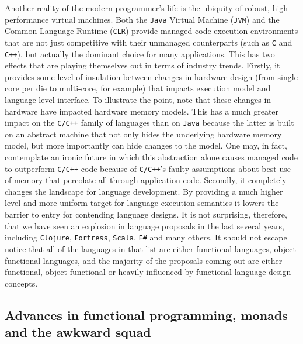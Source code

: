 Another reality of the modern programmer's life is the ubiquity of
robust, high-performance virtual machines. Both the \texttt{Java}
Virtual Machine (\texttt{JVM}) and the Common Language Runtime
(\texttt{CLR}) provide managed code execution environments that are
not just competitive with their unmanaged counterparts (such as
\texttt{C} and \texttt{C++}), but actually the dominant choice for
many applications. This has two effects that are playing themselves
out in terms of industry trends. Firstly, it provides some level of
insulation between changes in hardware design (from single core per
die to multi-core, for example) that impacts execution model and
language level interface. To illustrate the point, note that these
changes in hardware have impacted hardware memory models. This has a
much greater impact on the \texttt{C/C++} family of languages than on
\texttt{Java} because the latter is built on an abstract machine that
not only hides the underlying hardware memory model, but more
importantly can hide changes to the model. One may, in fact,
contemplate an ironic future in which this abstraction alone causes
managed code to outperform \texttt{C/C++} code because of
\texttt{C/C++}'s faulty assumptions about best use of memory that
percolate all through application code. Secondly, it completely
changes the landscape for language development. By providing a much
higher level and more uniform target for language execution semantics
it lowers the barrier to entry for contending language designs. It is
not surprising, therefore, that we have seen an explosion in language
proposals in the last several years, including \texttt{Clojure},
\texttt{Fortress}, \texttt{Scala}, \texttt{F\#} and many others. It
should not escape notice that all of the languages in that list are
either functional languages, object-functional languages, and the
majority of the proposals coming out are either functional,
object-functional or heavily influenced by functional language design
concepts.

\subsection{Advances in functional programming, monads and the awkward squad}

